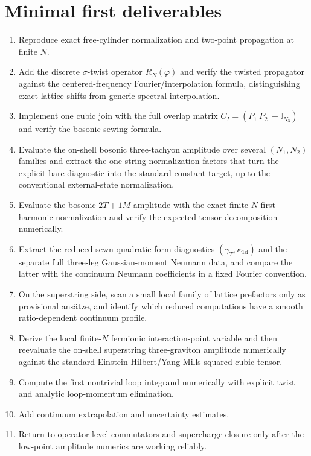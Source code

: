 \documentclass[11pt]{article}
\numberwithin{equation}{section}
\begin{document}
\section{Minimal first deliverables}
\begin{enumerate}
\item Reproduce exact free-cylinder normalization and two-point propagation at finite $N$.
\item Add the discrete $\sigma$-twist operator $R_N(\varphi)$ and verify the twisted propagator against the centered-frequency Fourier/interpolation formula, distinguishing exact lattice shifts from generic spectral interpolation.
\item Implement one cubic join with the full overlap matrix $C_I=(P_1\ P_2\ -\mathbb I_{N_3})$ and verify the bosonic sewing formula.
\item Evaluate the on-shell bosonic three-tachyon amplitude over several $(N_1,N_2)$ families and extract the one-string normalization factors that turn the explicit bare diagnostic into the standard constant target, up to the conventional external-state normalization.
\item Evaluate the bosonic $2T+1M$ amplitude with the exact finite-$N$ first-harmonic normalization and verify the expected tensor decomposition numerically.
\item Extract the reduced sewn quadratic-form diagnostics $(\gamma_T,\kappa_{1\mathrm d})$ and the separate full three-leg Gaussian-moment Neumann data, and compare the latter with the continuum Neumann coefficients in a fixed Fourier convention.
\item On the superstring side, scan a small local family of lattice prefactors only as provisional ans\"atze, and identify which reduced computations have a smooth ratio-dependent continuum profile.
\item Derive the local finite-$N$ fermionic interaction-point variable and then reevaluate the on-shell superstring three-graviton amplitude numerically against the standard Einstein-Hilbert/Yang-Mills-squared cubic tensor.
\item Compute the first nontrivial loop integrand numerically with explicit twist and analytic loop-momentum elimination.
\item Add continuum extrapolation and uncertainty estimates.
\item Return to operator-level commutators and supercharge closure only after the low-point amplitude numerics are working reliably.
\end{enumerate}
\end{document}

